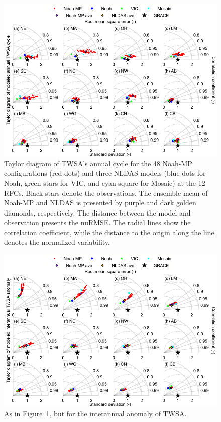 \documentclass[essd, manuscript]{copernicus}
\begin{document}
\begin{figure}[t]
  \includegraphics[width=14cm]{fig/fig02.pdf}
  \caption{Taylor diagram of TWSA's annual cycle for the 48 Noah-MP configurations (red dots) and three NLDAS models (blue dots for Noah, green stars for VIC, and cyan square for Mosaic) at the 12 RFCs. Black stars denote the observations. The ensemble mean of Noah-MP and NLDAS is presented by purple and dark golden diamonds, respectively. The distance between the model and observation presents the nuRMSE\@. The radial lines show the correlation coefficient, while the distance to the origin along the line denotes the normalized variability.}
  \label{fig:twsa:ancy:tss}
\end{figure}

\begin{figure}[t]
  \includegraphics[width=14cm]{fig/fig03.pdf}
  \caption{As in Figure~\ref{fig:twsa:ancy:tss}, but for the interannual anomaly of TWSA.}
  \label{fig:twsa:anom:tss}
\end{figure}
\end{document}
